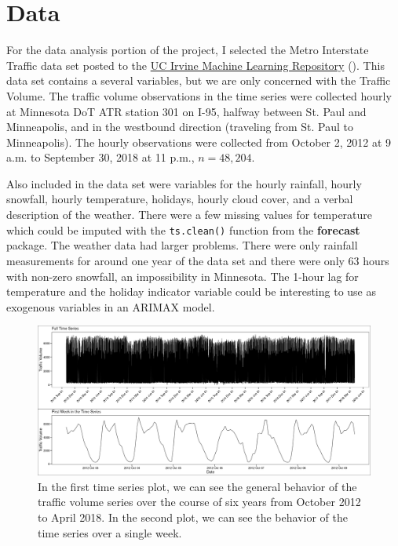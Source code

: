\documentclass[
]{article}
\begin{document}
\section*{Data}

For the data analysis portion of the project, I selected the Metro Interstate Traffic data set posted to the \href{https://archive.ics.uci.edu/ml/datasets/Metro+Interstate+Traffic+Volume}{UC Irvine Machine Learning Repository} (\cite*{hogue_uci_2019}). This data set contains a several variables, but we are only concerned with the Traffic Volume. The traffic volume observations in the time series were collected hourly at Minnesota DoT ATR station 301 on I-95, halfway between St. Paul and Minneapolis, and in the westbound direction (traveling from St. Paul to Minneapolis). The hourly observations were collected from October 2, 2012 at 9 a.m. to September 30, 2018 at 11 p.m., $n = 48,204$.

Also included in the data set were variables for the hourly rainfall, hourly snowfall, hourly temperature, holidays, hourly cloud cover, and a verbal description of the weather. There were a few missing values for temperature which could be imputed with the \texttt{ts.clean()} function from the \textbf{forecast} package. The weather data had larger problems. There were only rainfall measurements for around one year of the data set and there were only 63 hours with non-zero snowfall, an impossibility in Minnesota. The 1-hour lag for temperature and the holiday indicator variable could be interesting to use as exogenous variables in an ARIMAX model.

\begin{figure}[ht]
  \begin{center}
    \includegraphics{Plots/full_traffic_ts.png}
    \caption{In the first time series plot, we can see the general behavior of the traffic volume series over the course of six years from October 2012 to April 2018. In the second plot, we can see the behavior of the time series over a single week.}
    \label{fig_ts_plots}
  \end{center}
\end{figure}
\end{document}
